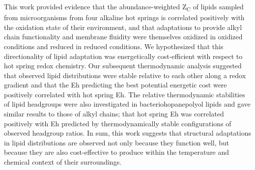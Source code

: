 This work provided evidence that the abundance-weighted Z\textsubscript{C} of lipids sampled from microorganisms from four alkaline hot springs is correlated positively with the oxidation state of their environment, and that adaptations to provide alkyl chain functionality and membrane fluidity were themselves oxidized in oxidized conditions and reduced in reduced conditions. We hypothesized that this directionality of lipid adaptation was energetically cost-efficient with respect to hot spring redox chemistry. Our subsequent thermodynamic analysis suggested that observed lipid distributions were stable relative to each other along a redox gradient and that the Eh predicting the best potential energetic cost were positively correlated with hot spring Eh. The relative thermodynamic stabilities of lipid headgroups were also investigated in bacteriohopanepolyol lipids and gave similar results to those of alkyl chains; that hot spring Eh was correlated positively with Eh predicted by thermodynamically stable configurations of observed headgroup ratios. In sum, this work suggests that structural adaptations in lipid distributions are observed not only because they function well, but because they are also cost-effective to produce within the temperature and chemical context of their surroundings.